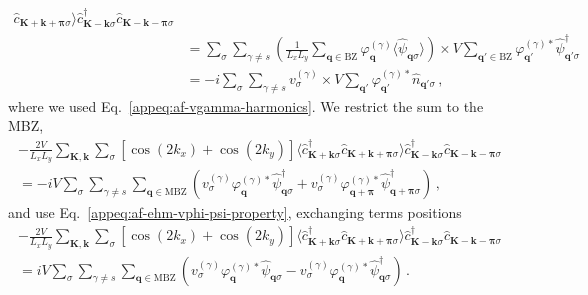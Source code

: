 \begin{tabproof}
\begin{align}
		\hat c_{\mathbf{K}+\mathbf{k}+\bm{\pi} \sigma}
		\rangle
		\hat c_{\mathbf{K}-\mathbf{k} \sigma}^\dagger \hat c_{\mathbf{K}-\mathbf{k}-\bm{\pi} \sigma} \nonumber \\
		&= \sum_\sigma \sum_{\gamma \neq s} \left(
		\frac{1}{L_x L_y} \sum_{\mathbf{q}\in\mathrm{BZ}} \varphi_\mathbf{q}^{(\gamma)}
		\langle
		\hat \psi_{\mathbf{q}\sigma}
		\rangle
		\right) \times V
		\sum_{\mathbf{q}'\in\mathrm{BZ}}
		\varphi_{\mathbf{q}'}^{(\gamma)*}
		\hat \psi_{\mathbf{q}'\sigma}^\dagger \nonumber \\ 
		&= -i\sum_\sigma \sum_{\gamma \neq s} v_\sigma^{(\gamma)} \times V
		\sum_{\mathbf{q}'}
		\varphi_{\mathbf{q}'}^{(\gamma)*}
		\hat n_{\mathbf{q}'\sigma} \, ,
		\label{eq:af-V-fock-int3-offdiag-implicit2}
	\end{align}
	where we used Eq.~\eqref{appeq:af-vgamma-harmonics}. We restrict the sum to the MBZ,
	\begin{multline*}
		-\frac{2V}{L_x L_y} \sum_{\mathbf{K}, \mathbf{k}} \sum_\sigma [
		\cos \left(
		2k_x
		\right)	+ \cos \left(
		2k_y
		\right)	
		] \langle
		\hat c_{\mathbf{K}+\mathbf{k} \sigma}^\dagger 
		\hat c_{\mathbf{K}+\mathbf{k}+\bm{\pi} \sigma}
		\rangle
		\hat c_{\mathbf{K}-\mathbf{k} \sigma}^\dagger \hat c_{\mathbf{K}-\mathbf{k}-\bm{\pi} \sigma} \\
		= -iV\sum_\sigma \sum_{\gamma \neq s}
		\sum_{\mathbf{q}\in\mathrm{MBZ}}
		\left(
		v^{(\gamma)}_\sigma \varphi_\mathbf{q}^{(\gamma)*}
		\hat \psi_{\mathbf{q}\sigma}^\dagger + v^{(\gamma)}_\sigma \varphi_{\mathbf{q}+\bm{\pi}}^{(\gamma)*}
		\hat \psi_{\mathbf{q}+\bm{\pi}\sigma}^\dagger
		\right) \, ,
	\end{multline*}
	and use Eq.~\eqref{appeq:af-ehm-vphi-psi-property}, exchanging terms positions
	\begin{multline}
		-\frac{2V}{L_x L_y} \sum_{\mathbf{K}, \mathbf{k}} \sum_\sigma [
		\cos \left(
		2k_x
		\right)	+ \cos \left(
		2k_y
		\right)	
		] \langle
		\hat c_{\mathbf{K}+\mathbf{k} \sigma}^\dagger 
		\hat c_{\mathbf{K}+\mathbf{k}+\bm{\pi} \sigma}
		\rangle
		\hat c_{\mathbf{K}-\mathbf{k} \sigma}^\dagger \hat c_{\mathbf{K}-\mathbf{k}-\bm{\pi} \sigma} \\
		= iV\sum_\sigma \sum_{\gamma \neq s}
		\sum_{\mathbf{q}\in\mathrm{MBZ}}
		\left(
		v^{(\gamma)}_\sigma \varphi_\mathbf{q}^{(\gamma)*}
		\hat \psi_{\mathbf{q}\sigma} - v^{(\gamma)}_\sigma \varphi_\mathbf{q}^{(\gamma)*}
		\hat \psi_{\mathbf{q}\sigma}^\dagger
		\right) \, .
		\label{eq:af-V-fock-int5-offdiag}
	\end{multline}
	

\end{tabproof}
